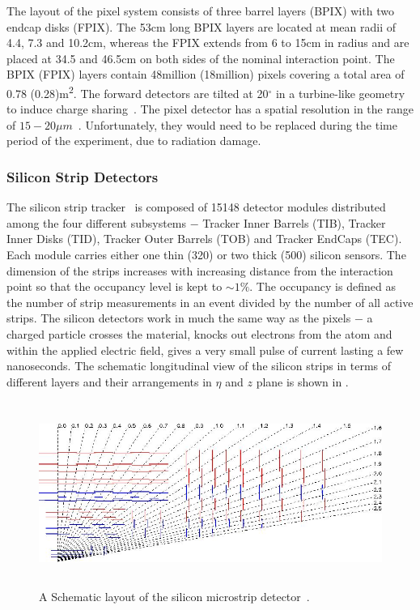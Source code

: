 The layout of the pixel system consists of three barrel layers (\gls{BPIX}) with two endcap disks (\gls{FPIX}). The 53\unit{cm} long BPIX 
layers are located at mean radii of 4.4, 7.3 and 10.2\unit{cm}, whereas the FPIX extends from 6 to 15\unit{cm} in radius and are placed at 34.5 and 
46.5\unit{cm} on both sides of the nominal interaction point. The BPIX (FPIX) layers contain 48\unit{million} (18\unit{million}) pixels covering a 
total area of 0.78 (0.28)\unit{m^2}. The forward detectors are tilted at 20$^{\circ}$ in a turbine-like geometry to induce charge 
sharing~\cite{Atac:2002mk}. The pixel detector has a spatial resolution in the range of $15-20\unit{\mu{m}}$~\cite{Karimaki:368412}.
Unfortunately, they would need to be replaced during the time period of the experiment, due to radiation damage.



\subsubsection{Silicon Strip Detectors}
The silicon strip tracker~\cite{Chatrchyan:2008aa,Karimaki:368412} is composed of 15148 detector modules distributed among the four different 
subsystems $-$ Tracker Inner Barrels (\gls{TIB}), Tracker Inner Disks (\gls{TID}), Tracker Outer Barrels (\gls{TOB}) and Tracker EndCaps (\gls{TEC}). Each module
carries either one thin (320\unit{}) or two thick (500\unit{}) silicon sensors. The dimension of the strips increases with increasing 
distance from the interaction point so that the occupancy level is kept to $\sim1\%$. The occupancy is defined as the number of strip measurements 
in an event divided by the number of all active strips. The silicon detectors work in much the same way as the pixels $-$ a charged particle crosses 
the material, knocks out electrons from the atom and within the applied electric field, gives a very small pulse of current lasting a few nanoseconds. 
The schematic longitudinal view of the silicon strips in terms of different layers and their arrangements in $\eta$ and $z$ plane is shown in 
\fig{\ref{fig:SiliconStrips}} .
\begin{figure}[h!]
 \centering
 \includegraphics[width=12cm,height=6cm]{ch2/figures/SiliconStrip.png}
 \caption{A Schematic layout of the silicon microstrip detector~\cite{Chatrchyan:2008aa}.}
 \label{fig:SiliconStrips}
\end{figure}

